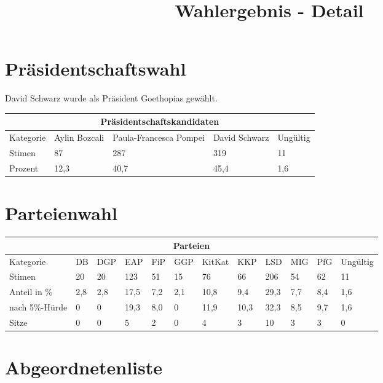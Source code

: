 \documentclass{sasbase}
\begin{document}
\onecolumn
\title{Wahlergebnis - Detail}

\mytitle

\setlength{\parindent}{0mm}
\setlength{\parskip}{2mm}

\section{Präsidentschaftswahl}

David Schwarz wurde als Präsident Goethopias gewählt.

\begin{tabular}{ |p{3cm}||p{3cm}|p{3cm}|p{3cm}|p{3cm}|  }
 \hline
 \multicolumn{5}{|c|}{Präsidentschaftskandidaten} \\
 \hline
 Kategorie & Aylin Bozcali  & Paula-Francesca Pompei & David Schwarz & Ungültig\\
 \hline
 Stimen   & 87    & 287 &   319 & 11 \\
 Prozent &  12,3  & 40,7   & 45,4 & 1,6 \\
 \hline
\end{tabular}



\section{Parteienwahl}

\begin{tabular}{ |p{3cm}||p{1cm}|p{1cm}|p{1cm}|p{1cm}|p{1cm}|p{1cm}|p{1cm}|p{1cm}|p{1cm}|p{1cm}|p{1.2cm}|  }
 \hline
 \multicolumn{12}{|c|}{Parteien} \\
 \hline
 Kategorie & DB & DGP & EAP & FiP & GGP & KitKat & KKP & LSD & MIG & PfG & Ungültig\\
 \hline
 Stimen   & 20 & 20  & 123 & 51 & 15 & 76 & 66 & 206 & 54 & 62 & 11 \\
 Anteil in \%  & 2,8 & 2,8  & 17,5 & 7,2 & 2,1 & 10,8 & 9,4 & 29,3 & 7,7 & 8,4 & 1,6 \\
nach 5\%-Hürde  & 0 & 0 & 19,3  & 8,0 & 0 & 11,9 & 10,3 & 32,3 & 8,5 & 9,7 & 1,6 \\
 \hline
  \hline
 Sitze & 0 & 0 & 5 & 2 & 0 & 4 & 3 & 10 & 3 & 3 & 0\\
 \hline
\end{tabular}

\section{Abgeordnetenliste}
\end{document}
